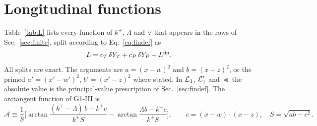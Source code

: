 \section{Longitudinal functions}\label{app:long}

Table~\ref{tab:L} lists every function of $k^+$, $\Lambda$ and $\vee$ that appears in the rows of Sec.~\ref{sec:finite}, split according to Eq.~\eqref{eq:findef} as
\begin{equation}
L=c_T\,\delta Y_T+c_P\,\delta Y_P+L^{\rm fin}.
\end{equation}
All splits are exact. The arguments are $a=(x-w)^2$ and $b=(x-z)^2$, or the primed $a'=(x'-w')^2$, $b'=(x'-z)^2$ where stated. In $\mathcal{L}_{1}$, $\mathcal{L}_{1}'$ and $\Lt$ the absolute value is the principal-value prescription of Sec.~\ref{sec:findef}. The arctangent function of G1-III is
\begin{equation}
\mathcal A\equiv\frac1S\Big[\arctan\frac{(k^+-\Lambda)\,b-k^+c}{k^+S}-\arctan\frac{\Lambda b-k^+c}{k^+S}\Big],\qquad c=(x-w)\cdot(x-z),\quad S=\sqrt{ab-c^2}.
\end{equation}

